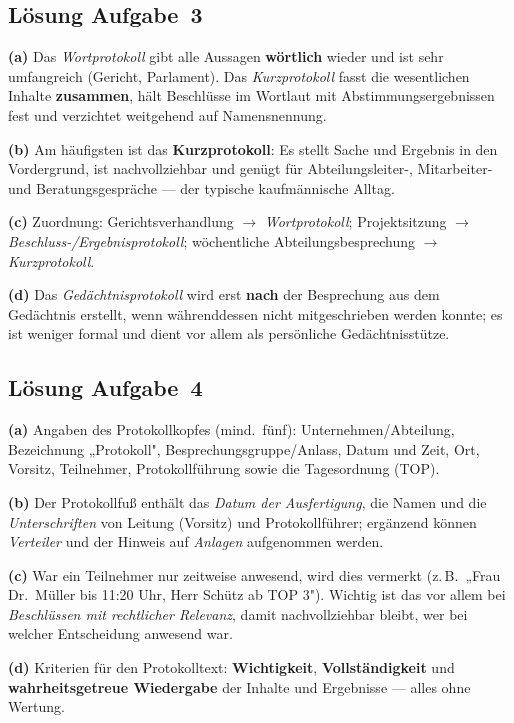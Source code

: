 \documentclass[11pt, a4paper]{article}
\begin{document}
\subsection*{Lösung Aufgabe~3}
\begin{loesung}
\textbf{(a)} Das \emph{Wortprotokoll} gibt alle Aussagen \textbf{wörtlich} wieder und ist
sehr umfangreich (Gericht, Parlament). Das \emph{Kurzprotokoll} fasst die wesentlichen
Inhalte \textbf{zusammen}, hält Beschlüsse im Wortlaut mit Abstimmungsergebnissen fest und
verzichtet weitgehend auf Namensnennung.

\textbf{(b)} Am häufigsten ist das \textbf{Kurzprotokoll}: Es stellt Sache und Ergebnis in
den Vordergrund, ist nachvollziehbar und genügt für Abteilungsleiter-, Mitarbeiter- und
Beratungsgespräche --- der typische kaufmännische Alltag.

\textbf{(c)} Zuordnung: Gerichtsverhandlung $\rightarrow$ \emph{Wortprotokoll};
Projektsitzung $\rightarrow$ \emph{Beschluss-/Ergebnisprotokoll}; wöchentliche
Abteilungsbesprechung $\rightarrow$ \emph{Kurzprotokoll}.

\textbf{(d)} Das \emph{Gedächtnisprotokoll} wird erst \textbf{nach} der Besprechung aus dem
Gedächtnis erstellt, wenn währenddessen nicht mitgeschrieben werden konnte; es ist weniger
formal und dient vor allem als persönliche Gedächtnisstütze.
\end{loesung}

\subsection*{Lösung Aufgabe~4}
\begin{loesung}
\textbf{(a)} Angaben des Protokollkopfes (mind.\ fünf): Unternehmen/Abteilung,
Bezeichnung „Protokoll", Besprechungsgruppe/Anlass, Datum und Zeit, Ort, Vorsitz,
Teilnehmer, Protokollführung sowie die Tagesordnung (TOP).

\textbf{(b)} Der Protokollfuß enthält das \emph{Datum der Ausfertigung}, die Namen und
die \emph{Unterschriften} von Leitung (Vorsitz) und Protokollführer; ergänzend können
\emph{Verteiler} und der Hinweis auf \emph{Anlagen} aufgenommen werden.

\textbf{(c)} War ein Teilnehmer nur zeitweise anwesend, wird dies vermerkt (z.\,B.\
„Frau Dr.\ Müller bis 11:20 Uhr, Herr Schütz ab TOP 3"). Wichtig ist das vor allem bei
\emph{Beschlüssen mit rechtlicher Relevanz}, damit nachvollziehbar bleibt, wer bei welcher
Entscheidung anwesend war.

\textbf{(d)} Kriterien für den Protokolltext: \textbf{Wichtigkeit}, \textbf{Vollständigkeit}
und \textbf{wahrheitsgetreue Wiedergabe} der Inhalte und Ergebnisse --- alles ohne Wertung.
\end{loesung}
\end{document}
